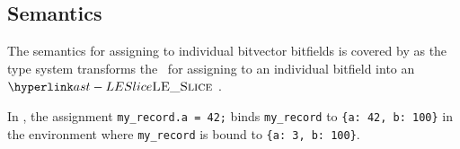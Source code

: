 \begin{mathpar}
\end{mathpar}

\subsection{Semantics}
The semantics for assigning to individual bitvector bitfields is covered by 
as the type system transforms the \untypedast\ for assigning to an individual bitfield into an $\LESlice$ \typedast.


In , the assignment
\verb|my_record.a = 42;| binds \verb|my_record| to \verb|{a: 42, b: 100}|
in the environment where \verb|my_record| is bound to \verb|{a: 3, b: 100}|.


